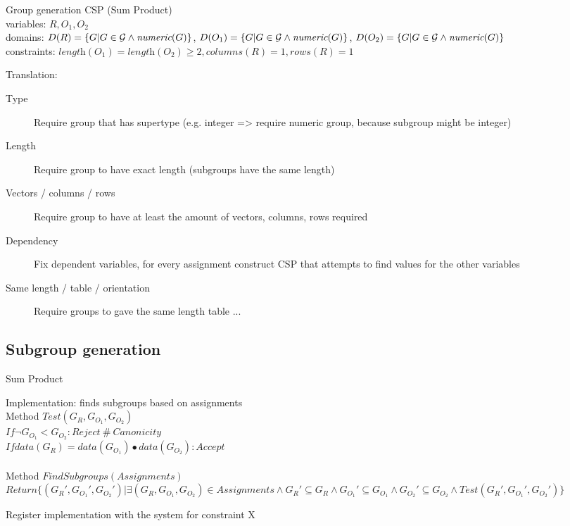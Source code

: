 \documentclass{sig-alternate-05-2015}
\newcommand{\format}[1]{\textit{#1}\xspace}
\newcommand{\numeric}{\format{numeric}}
\newcommand{\plength}{\format{length}}
\newcommand{\prows}{\format{rows}}
\newcommand{\pcols}{\format{columns}}
\begin{document}
Group generation CSP (Sum Product)\\
variables: $R, O_1, O_2$\\
domains: $D(R) = \{ G | G \in {\cal G} \land \numeric(G)\}$, $D(O_1) = \{ G | G \in {\cal G} \land \numeric(G)\}$, $D(O_2) = \{ G | G \in {\cal G} \land \numeric(G)\}$\\
constraints: $\plength(O_1) = \plength(O_2) \geq 2, \pcols(R) = 1, \prows(R) = 1$ %

Translation:
\begin{description}
  \item[Type] Require group that has supertype (e.g. integer => require numeric group, because subgroup might be integer)
  \item[Length] Require group to have exact length (subgroups have the same length)
  \item[Vectors / columns / rows] Require group to have at least the amount of vectors, columns, rows required
  \item[Dependency] Fix dependent variables, for every assignment construct CSP that attempts to find values for the other variables
  \item[Same length / table / orientation] Require groups to gave the same length table ...
\end{description}

\subsection{Subgroup generation}
Sum Product

Implementation: finds subgroups based on assignments\\
Method $Test(G_R, G_{O_1}, G_{O_2})$\\
$If \lnot G_{O_1} < G_{O_2}: Reject~\#~Canonicity$\\
$If data(G_R) = data(G_{O_1}) \bullet data(G_{O_2}): Accept$
\\\\
Method $FindSubgroups(Assignments)$\\
$Return \{ (G_R', G_{O_1}', G_{O_2}') | \exists (G_R, G_{O_1}, G_{O_2}) \in Assignments \land G_R' \subseteq G_R \land G_{O_1}' \subseteq G_{O_1} \land G_{O_2}' \subseteq G_{O_2} \land Test(G_R', G_{O_1}', G_{O_2}') \}$

Register implementation with the system for constraint X
\end{document}
